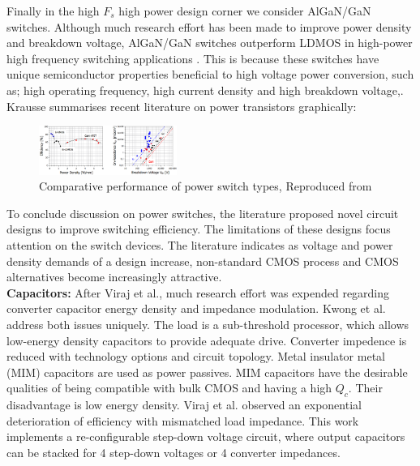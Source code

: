 \documentclass[letterpaper,twocolumn,10pt]{article}
\begin{document}
\indent Finally in the high $F_s$ high power design corner we consider AlGaN/GaN switches. Although much research effort has been made to improve power density and breakdown voltage, AlGaN/GaN switches outperform LDMOS in high-power high frequency switching applications \cite{Goyal2013}. This is because these switches have unique semiconductor properties beneficial to high voltage power conversion, such as; high operating frequency, high current density and high breakdown voltage\cite{Alamo2009},\cite{Mustapha2008}. Krausse\cite{Krausse2013} summarises recent literature on power transistors graphically:\\ %
\begin{figure}[here]
\includegraphics[width=0.4\textwidth]{TransistorPerf}
\caption{Comparative performance of power switch types, Reproduced from\cite{Krausse2013}}
\label{GaNCharacter}
\end{figure}
\indent To conclude discussion on power switches, the literature proposed novel circuit designs to improve switching efficiency. The limitations of these designs focus attention on the switch devices. The literature indicates as voltage and power density demands of a design increase, non-standard CMOS process and CMOS alternatives become increasingly attractive.\\
\textbf{Capacitors: }After Viraj et al.\cite{Viraj2007}, much research effort was expended regarding converter capacitor energy density and impedance modulation. Kwong et al.\cite{Kwong2009} address both issues uniquely. The load is a sub-threshold processor, which allows low-energy density capacitors to provide adequate drive. Converter impedence is reduced with technology options and circuit topology. Metal insulator metal (MIM) capacitors are used as power passives. MIM capacitors have the desirable qualities of being compatible with bulk CMOS and having a high $Q_c$. Their disadvantage is low energy density. Viraj et al.\cite{Viraj2007} observed an exponential deterioration of efficiency with mismatched load impedance. This work implements a re-configurable step-down voltage circuit, where output capacitors can be stacked for 4 step-down voltages or 4 converter impedances.\\
\end{document}
